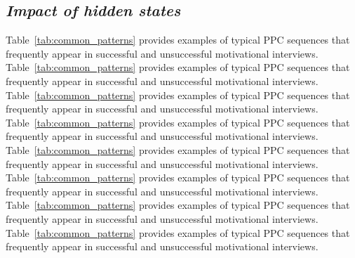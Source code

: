 \documentclass{amia}
\begin{document}
\subsection*{\textit{Impact of hidden states}}
Table~\ref{tab:common_patterns} provides examples of typical PPC sequences that frequently appear in successful and unsuccessful motivational interviews. Table~\ref{tab:common_patterns} provides examples of typical PPC sequences that frequently appear in successful and unsuccessful motivational interviews. Table~\ref{tab:common_patterns} provides examples of typical PPC sequences that frequently appear in successful and unsuccessful motivational interviews. Table~\ref{tab:common_patterns} provides examples of typical PPC sequences that frequently appear in successful and unsuccessful motivational interviews. Table~\ref{tab:common_patterns} provides examples of typical PPC sequences that frequently appear in successful and unsuccessful motivational interviews. Table~\ref{tab:common_patterns} provides examples of typical PPC sequences that frequently appear in successful and unsuccessful motivational interviews. Table~\ref{tab:common_patterns} provides examples of typical PPC sequences that frequently appear in successful and unsuccessful motivational interviews. Table~\ref{tab:common_patterns} provides examples of typical PPC sequences that frequently appear in successful and unsuccessful motivational interviews.
\end{document}
